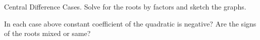 \documentclass[12pt, a4paper, addpoints]{exam}
\begin{document}
\begin{questions}
\question Central Difference Cases. Solve for the roots by factors  and sketch the graphs. 
\setlength{\columnsep}{20pt}
\begin{multicols}{3}
\end{multicols}
\question In each case above constant coefficient of the quadratic is negative? Are the  signs of the roots mixed or same?
\newpage


\end{questions}
\end{document}
